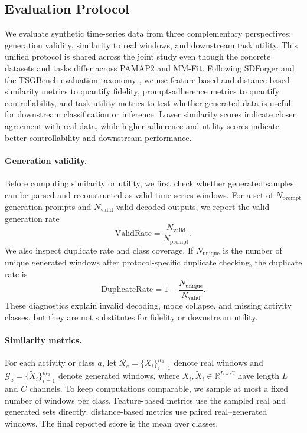\subsection{Evaluation Protocol}
\label{sec:evaluation_protocol}

We evaluate synthetic time-series data from three complementary perspectives:
generation validity, similarity to real windows, and downstream task utility.
This unified protocol is shared across the joint study even though the concrete
datasets and tasks differ across PAMAP2 and MM-Fit. Following SDForger
\cite{rousseau2025sdforger} and the TSGBench evaluation taxonomy
\cite{ang2023tsgbench}, we use feature-based and distance-based similarity
metrics to quantify fidelity, prompt-adherence metrics to quantify
controllability, and task-utility metrics to test whether generated data is
useful for downstream classification or inference. Lower similarity scores
indicate closer agreement with real data, while higher adherence and utility
scores indicate better controllability and downstream performance.

\paragraph{Generation validity.}
Before computing similarity or utility, we first check whether generated samples
can be parsed and reconstructed as valid time-series windows. For a set of
$N_{\mathrm{prompt}}$ generation prompts and $N_{\mathrm{valid}}$ valid decoded
outputs, we report the valid generation rate
\begin{equation}
    \mathrm{ValidRate}
    =
    \frac{N_{\mathrm{valid}}}{N_{\mathrm{prompt}}}.
\end{equation}
We also inspect duplicate rate and class coverage. If
$N_{\mathrm{unique}}$ is the number of unique generated windows after
protocol-specific duplicate checking, the duplicate rate is
\begin{equation}
    \mathrm{DuplicateRate}
    =
    1-\frac{N_{\mathrm{unique}}}{N_{\mathrm{valid}}}.
\end{equation}
These diagnostics explain invalid decoding, mode collapse, and missing activity
classes, but they are not substitutes for fidelity or downstream utility.

\paragraph{Similarity metrics.}
For each activity or class $a$, let
$\mathcal{R}_a=\{X_i\}_{i=1}^{n_a}$ denote real windows and
$\mathcal{G}_a=\{\tilde{X}_i\}_{i=1}^{m_a}$ denote generated windows, where
$X_i,\tilde{X}_i\in\mathbb{R}^{L\times C}$ have length $L$ and $C$ channels.
To keep computations comparable, we sample at most a fixed number of windows per
class. Feature-based metrics use the sampled real and generated sets directly;
distance-based metrics use paired real--generated windows. The final reported
score is the mean over classes.

